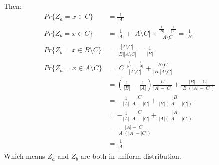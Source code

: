 \documentclass{article}
\begin{document}
Then:
\begin{align*}
  Pr\{Z_a = x\in C\} &= \frac{1}{|A|} \\
  Pr\{Z_b = x\in C\} &= \frac{1}{|A|} + |A\setminus C| \times \frac{\frac{1}{|B|} - \frac{1}{|A|}}{|A\setminus C|} = \frac{1}{|B|}\\
  Pr\{Z_b = x\in B\setminus C\} &= \frac{|A\setminus C|}{|B||A\setminus C|} = \frac{1}{|B|} \\
  Pr\{Z_a = x\in A\setminus C\} &= |C|\frac{\frac{1}{|B|} - \frac{1}{|A|}}{|A\setminus C|} + \frac{|B\setminus C|}{|B||A\setminus C|} \\
                     &= (\frac{1}{|B|}-\frac{1}{|A|})\frac{|C|}{|A| - |C|} + \frac{|B|-|C|}{|B|(|A|-|C|)}\\
                     &= -\frac{1}{|A|}\frac{|C|}{|A| - |C|} + \frac{|B|}{|B|(|A|-|C|)} \\
                     &= -\frac{1}{|A|}\frac{|C|}{|A| - |C|} + \frac{|A|}{|A|(|A|-|C|)} \\
                     &= \frac{|A| - |C|}{|A|(|A|-|C|)} \\
                     &= \frac{1}{|A|}
\end{align*}
Which means $Z_a$ and $Z_b$ are both in uniform distribution.
\end{document}
